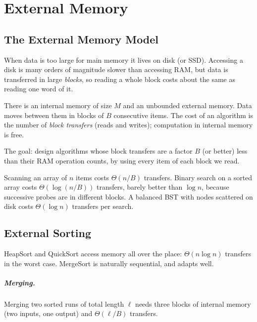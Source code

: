 \chapter{External Memory}

\section{The External Memory Model}

When data is too large for main memory it lives on disk (or SSD). Accessing a
disk is many orders of magnitude slower than accessing RAM, but data is
transferred in large \emph{blocks}, so reading a whole block costs about the
same as reading one word of it.

\begin{definition}
There is an internal memory of size $M$ and an unbounded external memory.
Data moves between them in blocks of $B$ consecutive items. The cost of an
algorithm is the number of \emph{block transfers} (reads and writes); computation
in internal memory is free.
\end{definition}

The goal: design algorithms whose block transfers are a factor $B$ (or better)
less than their RAM operation counts, by using every item of each block we read.

\begin{example}
Scanning an array of $n$ items costs $\Theta(n/B)$ transfers. Binary search on a
sorted array costs $\Theta(\log(n/B))$ transfers, barely better than $\log n$, because successive probes are in
different blocks. A balanced BST with nodes scattered on disk costs
$\Theta(\log n)$ transfers per search.
\end{example}

\section{External Sorting}

HeapSort and QuickSort access memory all over the place: $\Theta(n \log n)$
transfers in the worst case. MergeSort is naturally sequential, and adapts well.

\paragraph{Merging.} Merging two sorted runs of total length $\ell$ needs three
blocks of internal memory (two inputs, one output) and $\Theta(\ell / B)$
transfers.


